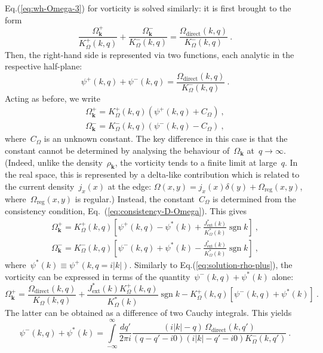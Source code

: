 \documentclass[preprint,aps,eqsecnum]{revtex4-1}
\newcommand{\fplus}[1]{{#1}^{+}}
\newcommand{\fminus}[1]{{#1}^{-}}
\newcommand{\sgn}{\mathop{\mathrm{sgn}}\nolimits}
\newcommand{\dct}[1]{{#1}_\mathrm{direct}}
\begin{document}
Eq.(\ref{eq:wh-Omega-3}) for vorticity is solved similarly: it is first
brought to the form
\begin{equation}
  \frac{\fplus{\Omega}_{\bm k}}{\fplus{K}_\Omega(k, q)}
+ \frac{\fminus{\Omega}_{\bm k}}{\fminus{K}_\Omega(k, q)} =
\frac{\dct{\Omega}(k, q)}{\fminus{K}_\Omega(k, q)}
\ .
\end{equation}
Then, the right-hand side is represented via two functions,
each analytic in the respective half-plane:
\begin{equation}
  \label{eq:psi-def}
  \fplus{\psi}(k, q) + \fminus{\psi}(k, q)
  = \frac{\dct{\Omega}(k, q)}{\fminus{K}_\Omega(k, q)}
  \ .
\end{equation}
Acting as before, we write
\begin{align}
  \fplus{\Omega}_{\bm k} = \fplus{K}_\Omega(k, q) (\fplus{\psi}(k, q)
  + C_\Omega)
  \ ,
  \\
  \fminus{\Omega}_{\bm k} = \fminus{K}_\Omega(k, q) (\fminus{\psi}(k, q)
  - C_\Omega)
  \ ,
\end{align}
where~$C_\Omega$ is an unknown constant. The key difference in this case
is that the constant cannot be determined by analysing  the behaviour
of~$\Omega_{\bm k}$ at~$q \to \infty$.
(Indeed, unlike the density~$\rho_{\bm k}$,
the vorticity tends to a finite limit at large~$q$. In  the real space,
this is represented by a delta-like contribution which is related to the
current density~$j_x(x)$ at the edge:
$\Omega(x, y) = j_x(x) \delta(y) + \Omega_\mathrm{reg}(x, y)$,
where~$\Omega_\mathrm{reg}(x, y)$ is regular.)
Instead, the constant~$C_\Omega$ is determined from the consistency condition,
Eq.~(\ref{eq:consistency-D-Omega}). This gives
\begin{align}
  \label{eq:solution-omega-plus-0}
  \fplus{\Omega}_{\bm k}
  = \fplus{K}_\Omega(k, q)  \left[\fplus{\psi}(k, q) - \psi^\ast(k) +
  \frac{J_\mathrm{ext}^\ast(k)}{K_\Omega^\ast(k)}\sgn{k} \right]
  \ ,
  \\
  \label{eq:solution-omega-minus}
  \fminus{\Omega}_{\bm k} = \fminus{K}_\Omega(k, q)
  \left[\fminus{\psi}(k, q) + \psi^\ast(k)
  - \frac{J_\mathrm{ext}^\ast(k)}{K_\Omega^\ast(k)} \sgn{k}\right]
  \ ,
\end{align}
where~$\psi^\ast(k) \equiv \fplus{\psi}(k, q = i |k|)$. Similarly to Eq.(\ref{eq:solution-rho-plus}), the vorticity can be
expressed in terms of the quantity~$\fminus{\psi}(k, q) + \psi^\ast(k)$ alone:
\begin{equation}
  \label{eq:solution-omega-plus}
  \fplus{\Omega}_{\bm k} = \frac{\dct{\Omega}(k, q)}{K_\Omega(k, q)}
  + \frac{J_\mathrm{ext}^\ast(k) \fplus{K}_\Omega(k, q)}{K_\Omega^\ast(k)} \sgn{k}
  - \fplus{K}_\Omega(k, q) \left[\fminus{\psi}(k, q) + \psi^\ast(k)\right]
  \ .
\end{equation}
The latter can be obtained as a difference of  two  Cauchy integrals.
This yields
\begin{equation}
  \label{eq:solution-psi}
  \fminus{\psi}(k, q) + \psi^\ast(k) = \int\limits_{-\infty}^{\infty}
  \frac{dq'}{2\pi i} \frac{(i|k| - q) \,
  \dct{\Omega}(k, q')}{(q - q' - i0)(i|k| - q' - i0) \fminus{K}_\Omega(k, q')}
  \ .
\end{equation}
\end{document}
